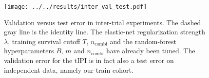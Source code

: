 \begin{figure}
    \centering
    \texttt{[image: ../../results/inter\_val\_test.pdf]}
    \caption{Validation versus test error in inter-trial experiments. The dashed gray line is the 
        identity line. The elastic-net regularization strength $\lambda$, training survival cutoff 
        $T$, $n_\text{combi}$ and the random-forest hyperparameters $B$, $m$ and $n_\text{combi}$ 
        have already been tuned. The validation error for the $\text{tIPI}$ is in fact also a test 
        error on independent data, namely our train cohort.}
    \label{fig:inter-val-test}
\end{figure}